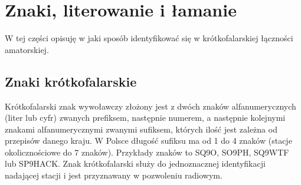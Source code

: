 \documentclass[a4paper,11pt]{article}
\begin{document}
\section{Znaki, literowanie i łamanie}
W tej części opisuję w jaki sposób identyfikować się w krótkofalarskiej łączności amatorskiej.
\subsection{Znaki krótkofalarskie}
Krótkofalarski znak wywoławczy złożony jest z dwóch znaków alfanumerycznych (liter lub cyfr) zwanych prefiksem, następnie numerem, a następnie kolejnymi znakami alfanumerycznymi zwanymi sufiksem, których ilość jest zależna od przepisów danego kraju. W Polsce długość sufiksu ma od 1 do 4 znaków (stacje okolicznościowe do 7 znaków). Przykłady znaków to SQ9O, SO9PH, SQ9WTF lub SP9HACK. Znak krótkofalarski służy do jednoznacznej identyfikacji nadającej stacji i jest przyznawany w pozwoleniu radiowym.
\end{document}
